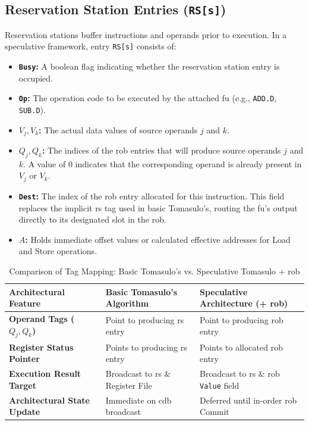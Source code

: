\subsection{Reservation Station Entries (\texttt{RS[s]})}
Reservation stations buffer instructions and operands prior to execution. In a speculative framework, entry \texttt{RS[s]} consists of:
\begin{itemize}
    \item \textbf{\texttt{Busy}:} A boolean flag indicating whether the reservation station entry is occupied.
    \item \textbf{\texttt{Op}:} The operation code to be executed by the attached \gls{fu} (e.g., \texttt{ADD.D}, \texttt{SUB.D}).
    \item \textbf{$V_j, V_k$:} The actual data values of source operands $j$ and $k$.
    \item \textbf{$Q_j, Q_k$:} The indices of the \gls{rob} entries that will produce source operands $j$ and $k$. A value of $0$ indicates that the corresponding operand is already present in $V_j$ or $V_k$.
    \item \textbf{\texttt{Dest}:} The index of the \gls{rob} entry allocated for this instruction. This field replaces the implicit \gls{rs} tag used in basic Tomasulo's, routing the \gls{fu}'s output directly to its designated slot in the \gls{rob}.
    \item \textbf{$A$:} Holds immediate offset values or calculated effective addresses for Load and Store operations.
\end{itemize}

\begin{table}[htpb]
\centering
\small
\begin{tabularx}{\textwidth}{>{\raggedright\arraybackslash}p{4.4cm}>{\raggedright\arraybackslash}X>{\raggedright\arraybackslash}X}
\hline
\textbf{Architectural Feature} & \textbf{Basic Tomasulo's Algorithm} & \textbf{Speculative Architecture (+ \gls{rob})} \\ \hline
\textbf{Operand Tags ($Q_j, Q_k$)} & Point to producing \gls{rs} entry & Point to producing \gls{rob} entry \\
\textbf{Register Status Pointer} & Points to producing \gls{rs} entry & Points to allocated \gls{rob} entry \\
\textbf{Execution Result Target} & Broadcast to \gls{rs} \& Register File & Broadcast to \gls{rs} \& \gls{rob} \texttt{Value} field \\
\textbf{Architectural State Update} & Immediate on \gls{cdb} broadcast & Deferred until in-order \gls{rob} Commit \\ \hline
\end{tabularx}
\caption{Comparison of Tag Mapping: Basic Tomasulo's vs. Speculative Tomasulo + \gls{rob}}
\label{tab:tomasulo_vs_rob_tags}
\end{table}

